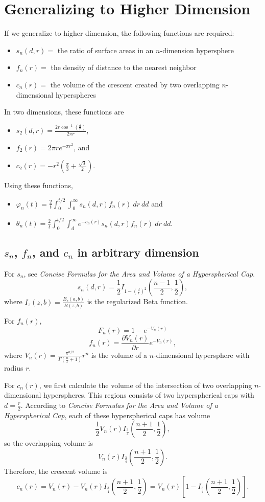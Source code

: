 \documentclass{article}
\begin{document}
\section{Generalizing to Higher Dimension}
If we generalize to higher dimension, the following functions are required:
\begin{itemize}
	\item $s_n(d, r) = $ the ratio of surface areas in an $n$-dimension hypersphere
	\item $f_n(r) = $ the density of distance to the nearest neighbor
	\item $c_n(r) = $ the volume of the crescent created by two overlapping $n$-dimensional hyperspheres
	\end{itemize}
In two dimensions, these functions are
\begin{itemize}
	\item $s_2(d,r) = \frac{2r\cos^{-1}\left(\frac{d}{r}\right)}{2\pi r}$,
	\item $f_2(r) = 2\pi re^{-\pi r^2}$, and
	\item $c_2(r) = -r^2\left(\frac{\pi}{3} + \frac{\sqrt{3}}{2}\right)$.
\end{itemize}
Using these functions,
\begin{itemize}
	\item $\varphi_n(t) = \frac{2}{t} \int_0^{t/2} \int_0^\infty s_n(d,r)f_n(r) \:dr \:dd$ and
	\item $\theta_n(t) = \frac{2}{t} \int_0^{t/2} \int_d^\infty e^{-c_n(r)}s_n(d,r)f_n(r) \:dr \:dd$.
\end{itemize}

\subsection{$s_n$, $f_n$, and $c_n$ in arbitrary dimension}
For $s_n$, see \textit{Concise Formulas for the Area and Volume of a Hyperspherical Cap}.
$$s_n(d,r) = \frac{1}{2}I_{1-\left(\frac{d}{r}\right)^2}\left(\frac{n-1}{2}, \frac{1}{2}\right),$$
where $I_z(z,b) = \frac{B_z(a,b)}{B(z,b)}$ is the regularized Beta function.

\bigbreak For $f_n(r)$,
$$F_n(r) = 1 - e^{-V_n(r)}$$
$$f_n(r) = \frac{\partial V_n(r)}{\partial r} e^{-V_n(r)},$$
where $V_n(r) = \frac{\pi^{n/2}}{\Gamma\left(\frac{n}{2}+1\right)}r^n$ is the volume of a $n$-dimensional hypersphere with radius $r$.

\bigbreak For $c_n(r)$, we first calculate the volume of the intersection of two overlapping $n$-dimensional hyperspheres. This regions consists of two hyperspherical caps with $d = \frac{r}{2}$. According to \textit{Concise Formulas for the Area and Volume of a Hyperspherical Cap}, each of these hyperspherical caps has volume
$$\frac{1}{2}V_n(r)I_\frac{3}{4}\left(\frac{n+1}{2}, \frac{1}{2}\right),$$
so the overlapping volume is
$$V_n(r)I_\frac{3}{4}\left(\frac{n+1}{2}, \frac{1}{2}\right).$$
Therefore, the crescent volume is
$$c_n(r) = V_n(r) - V_n(r)I_\frac{3}{4}\left(\frac{n+1}{2}, \frac{1}{2}\right) = V_n(r)\left[1 - I_\frac{3}{4}\left(\frac{n+1}{2}, \frac{1}{2}\right)\right].$$
\end{document}
